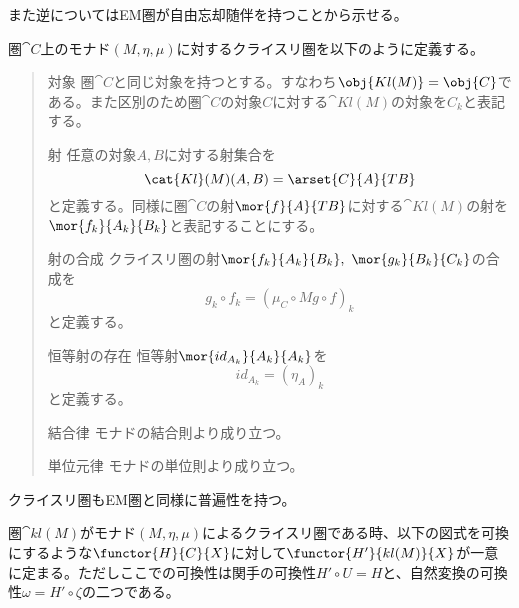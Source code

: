 \documentclass[uplatex,dvipdfmx]{jsarticle}
\begin{document}
  また逆についてはEM圏が自由忘却随伴を持つことから示せる。
  \begin{define}[クライスリ圏]
    圏$\cat{C}$上のモナド$(M,\eta,\mu)$に対するクライスリ圏を以下のように定義する。
    \begin{quote}
			\begin{mydescription}
				\item[対象] 圏$\cat{C}$と同じ対象を持つとする。すなわち$\obj{Kl(M)}=\obj{C}$である。また区別のため圏$\cat{C}$の対象$C$に対する$\cat{Kl}(M)$の対象を$C_k$と表記する。
				\item[射] 任意の対象$A,B$に対する射集合を\[\cat{Kl}(M)(A,B) = \arset{C}{A}{TB}\]と定義する。同様に圏$\cat{C}$の射$\mor{f}{A}{TB}$に対する$\cat{Kl}(M)$の射を$\mor{f_k}{A_k}{B_k}$と表記することにする。
				\item[射の合成]クライスリ圏の射$\mor{f_k}{A_k}{B_k},\ \mor{g_k}{B_k}{C_k}$の合成を\[g_k\circ f_k = (\mu_C\circ Mg\circ f)_k\]と定義する。
				\item[恒等射の存在] 恒等射$\mor{id_{A_k}}{A_k}{A_k}$を\[id_{A_k} = (\eta_A)_k\]と定義する。
				\item[結合律] モナドの結合則より成り立つ。
				\item[単位元律] モナドの単位則より成り立つ。
			\end{mydescription}
		\end{quote}
  \end{define}
  クライスリ圏もEM圏と同様に普遍性を持つ。
  \begin{prop}[クライスリ圏の普遍性]
    圏$\cat{kl}(M)$がモナド$(M,\eta, \mu)$によるクライスリ圏である時、以下の図式を可換にするような$\functor{H}{C}{X}$に対して$\functor{H'}{kl(M)}{X}$が一意に定まる。ただしここでの可換性は関手の可換性$H'\circ U = H$と、自然変換の可換性$\omega = H'\circ\zeta$の二つである。
    \begin{center}
    \end{center}
  \end{prop}
\end{document}
